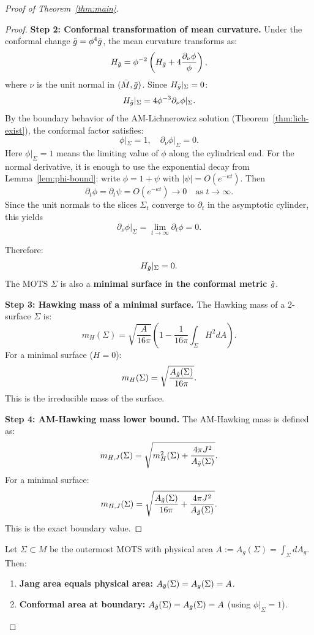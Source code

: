 \begin{proof}[Proof of Theorem~\ref{thm:main}]
\begin{proof}
\textbf{Step 2: Conformal transformation of mean curvature.}
Under the conformal change $\tilde{g} = \phi^4\bar{g}$, the mean curvature transforms as:
\[
H_{\tilde{g}} = \phi^{-2}\left(H_{\bar{g}} + 4\frac{\partial_\nu \phi}{\phi}\right),
\]
where $\nu$ is the unit normal in $(\bar{M}, \bar{g})$. Since $H_{\bar{g}}|_\Sigma = 0$:
\[
H_{\tilde{g}}|_\Sigma = 4\phi^{-3}\partial_\nu\phi|_\Sigma.
\]
By the boundary behavior of the AM-Lichnerowicz solution (Theorem~\ref{thm:lich-exist}), the conformal factor satisfies:
\[
\phi|_\Sigma = 1, \quad \partial_\nu\phi|_\Sigma = 0.
\]
Here $\phi|_\Sigma = 1$ means the limiting value of $\phi$ along the cylindrical end. For the normal derivative, it is enough to use the exponential decay from Lemma~\ref{lem:phi-bound}: write $\phi = 1 + \psi$ with $|\psi| = O(e^{-\kappa t})$. Then
\[
\partial_t\phi = \partial_t\psi = O(e^{-\kappa t}) \to 0 \quad \text{as } t \to \infty.
\]
Since the unit normals to the slices $\Sigma_t$ converge to $\partial_t$ in the asymptotic cylinder, this yields
\[
\partial_\nu\phi|_\Sigma=\lim_{t\to\infty}\partial_t\phi=0.
\]

Therefore:
\[
H_{\tilde{g}}|_\Sigma = 0.
\]
The MOTS $\Sigma$ is also a \textbf{minimal surface in the conformal metric $\tilde{g}$}.

\textbf{Step 3: Hawking mass of a minimal surface.}
The Hawking mass of a 2-surface $\Sigma$ is:
\[
m_H(\Sigma) = \sqrt{\frac{A}{16\pi}}\left(1 - \frac{1}{16\pi}\int_\Sigma H^2 dA\right).
\]
For a minimal surface ($H = 0$):
\[
m_H(\Sigma) = \sqrt{\frac{A_{\tilde{g}}(\Sigma)}{16\pi}}.
\]
This is the irreducible mass of the surface.

\textbf{Step 4: AM-Hawking mass lower bound.}
The AM-Hawking mass is defined as:
\[
m_{H,J}(\Sigma) = \sqrt{m_H^2(\Sigma) + \frac{4\pi J^2}{A_{\tilde{g}}(\Sigma)}}.
\]
For a minimal surface:
\[
m_{H,J}(\Sigma) = \sqrt{\frac{A_{\tilde{g}}(\Sigma)}{16\pi} + \frac{4\pi J^2}{A_{\tilde{g}}(\Sigma)}}.
\]
This is the exact boundary value.
\end{proof}

\begin{lemma}\label{lem:area-conformal}
Let $\Sigma \subset M$ be the outermost MOTS with physical area $A := A_g(\Sigma) = \int_\Sigma dA_g$. Then:
\begin{enumerate}[label=\textup{(\roman*)}]
    \item \textbf{Jang area equals physical area:} $A_{\bar{g}}(\Sigma) = A_g(\Sigma) = A$.
    \item \textbf{Conformal area at boundary:} $A_{\tilde{g}}(\Sigma) = A_{\bar{g}}(\Sigma) = A$ (using $\phi|_\Sigma = 1$).
\end{enumerate}
\end{lemma}


\end{proof}
